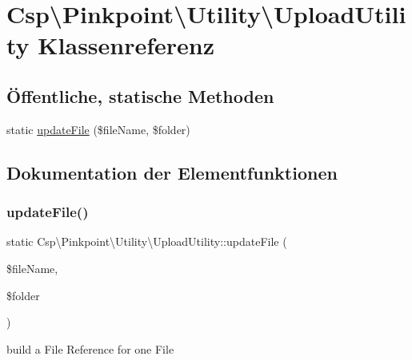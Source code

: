 \hypertarget{classCsp_1_1Pinkpoint_1_1Utility_1_1UploadUtility}{}\section{Csp\textbackslash{}Pinkpoint\textbackslash{}Utility\textbackslash{}Upload\+Utility Klassenreferenz}
\label{classCsp_1_1Pinkpoint_1_1Utility_1_1UploadUtility}
\subsection*{Öffentliche, statische Methoden}
\begin{DoxyCompactItemize}
\item 
static \hyperlink{classCsp_1_1Pinkpoint_1_1Utility_1_1UploadUtility_a712625d875e09364a5aba1f0ec3fdc37}{update\+File} (\$file\+Name, \$folder)
\end{DoxyCompactItemize}


\subsection{Dokumentation der Elementfunktionen}
\mbox{\label{classCsp_1_1Pinkpoint_1_1Utility_1_1UploadUtility_a712625d875e09364a5aba1f0ec3fdc37}} 
\subsubsection{\texorpdfstring{update\+File()}{updateFile()}}
{\footnotesize\ttfamily static Csp\textbackslash{}\+Pinkpoint\textbackslash{}\+Utility\textbackslash{}\+Upload\+Utility\+::update\+File (\begin{DoxyParamCaption}\item[{}]{\$file\+Name,  }\item[{}]{\$folder }\end{DoxyParamCaption})\hspace{0.3cm}{\ttfamily [static]}}

build a File Reference for one File


